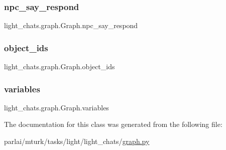 \subsubsection{\texorpdfstring{npc\+\_\+say\+\_\+respond}{npc\_say\_respond}}
{\footnotesize\ttfamily light\+\_\+chats.\+graph.\+Graph.\+npc\+\_\+say\+\_\+respond}

\mbox{\label{classlight__chats_1_1graph_1_1Graph_a8ac9ab3b5c6208e0df9b28d436c7c425}} 
\subsubsection{\texorpdfstring{object\+\_\+ids}{object\_ids}}
{\footnotesize\ttfamily light\+\_\+chats.\+graph.\+Graph.\+object\+\_\+ids}

\mbox{\label{classlight__chats_1_1graph_1_1Graph_a29a00f3191fb45f73bd784ed12cc2c2e}} 
\subsubsection{\texorpdfstring{variables}{variables}}
{\footnotesize\ttfamily light\+\_\+chats.\+graph.\+Graph.\+variables}



The documentation for this class was generated from the following file\+:\begin{DoxyCompactItemize}
\item 
parlai/mturk/tasks/light/light\+\_\+chats/\hyperlink{parlai_2mturk_2tasks_2light_2light__chats_2graph_8py}{graph.\+py}\end{DoxyCompactItemize}
